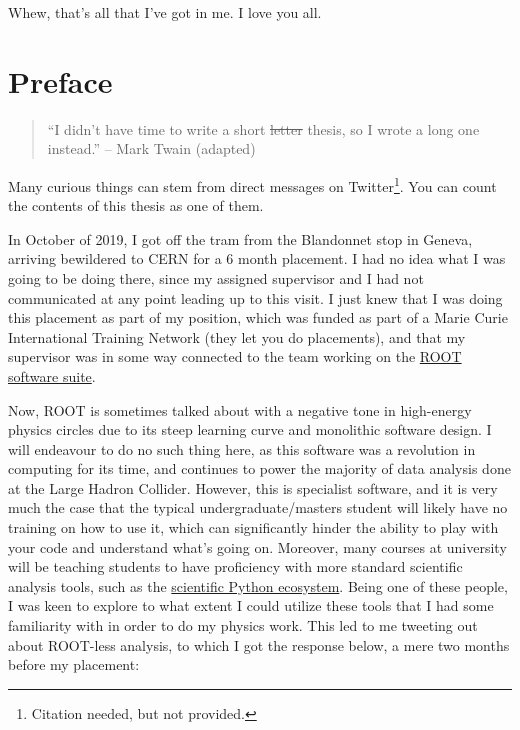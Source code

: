 \documentclass[
  11pt,
  numbers=noendperiod]{book}
\renewcommand*\contentsname{Table of contents}
\newcommand\contentsname{Table of contents}
\begin{document}
Whew, that's all that I've got in me. I love you all.

\cleardoublepage


\ifdefined\Shaded\renewenvironment{Shaded}{\begin{tcolorbox}[frame hidden, breakable, borderline west={3pt}{0pt}{shadecolor}, boxrule=0pt, enhanced, interior hidden, sharp corners]}{\end{tcolorbox}}\fi

\renewcommand*\contentsname{Table of contents}
{
\hypersetup{linkcolor=}
\setcounter{tocdepth}{2}
\tableofcontents
}

\hypertarget{preface}{%
\chapter*{Preface}\label{preface}}

\begin{quote}
``I didn't have time to write a short \sout{letter} thesis, so I wrote a
long one instead.'' -- Mark Twain (adapted)
\end{quote}

Many curious things can stem from direct messages on Twitter\footnote{Citation needed, but not provided.}. You
can count the contents of this thesis as one of them.

In October of 2019, I got off the tram from the Blandonnet stop in
Geneva, arriving bewildered to CERN for a 6 month placement. I had no
idea what I was going to be doing there, since my assigned supervisor
and I had not communicated at any point leading up to this visit. I just
knew that I was doing this placement as part of my position, which was
funded as part of a Marie Curie International Training Network (they let
you do placements), and that my supervisor was in some way connected to
the team working on the \href{https://root.cern.ch}{ROOT software suite}.

Now, ROOT is sometimes talked about with a negative tone in high-energy
physics circles due to its steep learning curve and monolithic software
design. I will endeavour to do no such thing here, as this software was
a revolution in computing for its time, and continues to power the
majority of data analysis done at the Large Hadron Collider. However,
this is specialist software, and it is very much the case that the
typical undergraduate/masters student will likely have no training on
how to use it, which can significantly hinder the ability to play with
your code and understand what's going on. Moreover, many courses at
university will be teaching students to have proficiency with more
standard scientific analysis tools, such as the \href{}{scientific
Python ecosystem}. Being one of these people, I was keen to explore to
what extent I could utilize these tools that I had some familiarity with
in order to do my physics work. This led to me tweeting out about ROOT-less analysis, to which I got the response below, a
mere two months before my placement:
\end{document}
